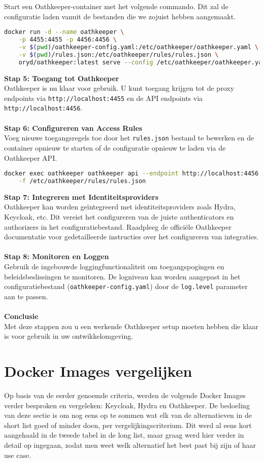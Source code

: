 Start een Oathkeeper-container met het volgende commando. Dit zal de configuratie laden vanuit de bestanden die we zojuist hebben aangemaakt.
\begin{lstlisting}[language=bash]
docker run -d --name oathkeeper \
    -p 4455:4455 -p 4456:4456 \
    -v $(pwd)/oathkeeper-config.yaml:/etc/oathkeeper/oathkeeper.yaml \
    -v $(pwd)/rules.json:/etc/oathkeeper/rules/rules.json \
    oryd/oathkeeper:latest serve --config /etc/oathkeeper/oathkeeper.yaml
\end{lstlisting}
\textbf{Stap 5: Toegang tot Oathkeeper}\\
Oathkeeper is nu klaar voor gebruik. U kunt toegang krijgen tot de proxy endpoints via \texttt{http://localhost:4455} en de API endpoints via \texttt{http://localhost:4456}.\\\\
\textbf{Stap 6: Configureren van Access Rules}\\
Voeg nieuwe toegangsregels toe door het \texttt{rules.json} bestand te bewerken en de container opnieuw te starten of de configuratie opnieuw te laden via de Oathkeeper API.\@
\begin{lstlisting}[language=bash]
docker exec oathkeeper oathkeeper api --endpoint http://localhost:4456 rules create \
    -f /etc/oathkeeper/rules/rules.json
\end{lstlisting}
\textbf{Stap 7: Integreren met Identiteitsproviders}\\
Oathkeeper kan worden geïntegreerd met identiteitsproviders zoals Hydra, Keycloak, etc. Dit vereist het configureren van de juiste authenticators en authorizers in het configuratiebestand. Raadpleeg de officiële Oathkeeper documentatie voor gedetailleerde instructies over het configureren van integraties.\\\\
\textbf{Stap 8: Monitoren en Loggen}\\
Gebruik de ingebouwde loggingfunctionaliteit om toegangspogingen en beleidsbeslissingen te monitoren. De logniveau kan worden aangepast in het configuratiebestand (\texttt{oathkeeper-config.yaml}) door de \texttt{log.level} parameter aan te passen.\\\\
\textbf{Conclusie}\\
Met deze stappen zou u een werkende Oathkeeper setup moeten hebben die klaar is voor gebruik in uw ontwikkelomgeving.


\section{Docker Images vergelijken}%
\label{sec:docker-images-vergelijken}
Op basis van de eerder genoemde criteria, werden de volgende Docker Images verder besproken en vergeleken: Keycloak, Hydra en Oathkeeper.
De bedoeling van deze sectie is om nog eens op te sommen wat elk van de alternatieven in de short list goed of minder doen, per vergelijkingscriterium.
Dit werd al eens kort aangehaald in de tweede tabel in de long list, maar graag werd hier verder in detail op ingegaan, zodat men weet welk alternatief
het best past bij zijn of haar use case.


